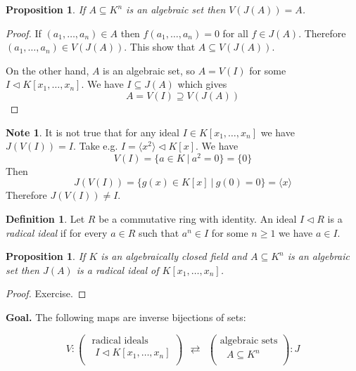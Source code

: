 \documentclass[12pt, letterpaper, oneside]{article}
\theoremstyle{plain}
\newtheorem{proposition}[theorem]{Proposition}
\theoremstyle{definition}
\newtheorem{definition}[theorem]{Definition}
\newtheorem{note}[theorem]{Note}
\newcommand{\subgp}[1]{\langle#1\rangle}
\newcommand{\vs}{\vskip 5mm}
\begin{document}
\vs\vs


\begin{proposition}
\label{PROP_VJAEQA}
If $A\subseteq K^{n}$ is an algebraic set then $V(J(A)) = A$. 
\end{proposition}


\begin{proof}
If $(a_{1}, \dots, a_{n}) \in A$ then $f(a_{1}, \dots, a_{n}) = 0$ for all $f\in J(A)$. Therefore 
$(a_{1}, \dots, a_{n})\in V(J(A))$.  This show that $A\subseteq V(J(A))$. 

On the other hand,  $A$ is an algebraic set, so $A = V(I)$ for some 
$I\lhd K[x_{1}, \dots, x_{n}]$. We have  $I \subseteq J(A)$ which gives 
$$A = V(I) \supseteq V(J(A))$$ 

\end{proof}

\vs\vs

\begin{note}
It is not true that for any ideal $I\in K[x_{1}, \dots, x_{n}]$ we have $J(V(I)) = I$. 
Take e.g. $I = \subgp{x^{2}}\lhd K[x]$. We have 
$$V(I) = \{ a\in K \ | \ a^{2} = 0\} = \{ 0 \}$$  
Then 
$$J(V(I)) = \{ g(x)\in K[x] \ | \ g(0) = 0 \} = \subgp{x}$$
Therefore $J(V(I)) \neq I$. 
\end{note}



\vs\vs

\begin{definition}
Let $R$ be a  commutative ring with identity. An ideal $I\lhd R$ is a \emph{radical ideal} if 
for every $a\in R$ such that $a^{n}\in I$ for some $n\geq 1$ we have $a\in I$.    
\end{definition}


\vs\vs

\begin{proposition}
\label{PROP_JAISRADID}
If $K$ is an algebraically closed field and $A\subseteq K^{n}$ is an algebraic set 
then $J(A)$ is a radical ideal of $K[x_{1}, \dots, x_{n}]$. 
\end{proposition}


\vs

\begin{proof}
Exercise. 
\end{proof}

\vs\vs

\textbf{Goal.} The following maps are inverse bijections of  sets:

$$
V\colon
\begin{pmatrix}
\text{ radical ideals} \\[1mm]
\text{  $I\lhd  K[x_{1}, \dots, x_{n}]$} \\
\end{pmatrix}
\ \ \rightleftarrows \ \ 
\begin{pmatrix}
\text{algebraic sets} \\[1mm]
\text{ $A\subseteq K^{n}$} \\
\end{pmatrix} \colon J
$$
\end{document}
